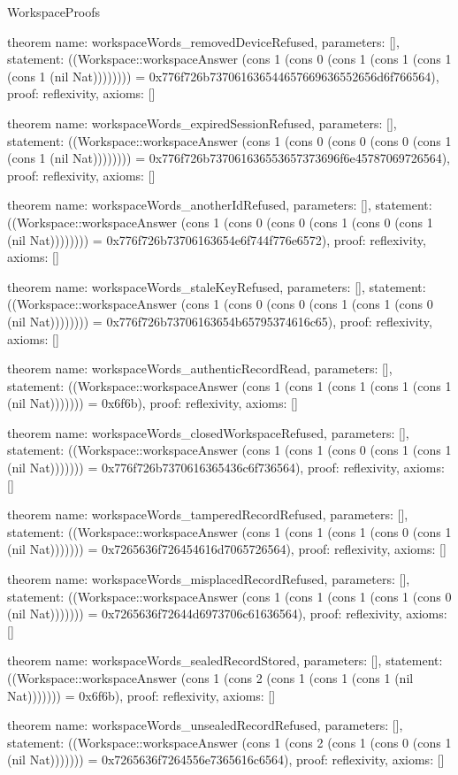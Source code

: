 \begin{lexlean}{WorkspaceProofs}
\begin{semanticmodule}
theorem{
  name: workspaceWords_removedDeviceRefused,
  parameters: [],
  statement: ((Workspace::workspaceAnswer (cons 1 (cons 0 (cons 1 (cons 1 (cons 1 (cons 1 (nil Nat)))))))) = 0x776f726b737061636544657669636552656d6f766564),
  proof: reflexivity{},
  axioms: []
}

theorem{
  name: workspaceWords_expiredSessionRefused,
  parameters: [],
  statement: ((Workspace::workspaceAnswer (cons 1 (cons 0 (cons 0 (cons 0 (cons 1 (cons 1 (nil Nat)))))))) = 0x776f726b737061636553657373696f6e45787069726564),
  proof: reflexivity{},
  axioms: []
}

theorem{
  name: workspaceWords_anotherIdRefused,
  parameters: [],
  statement: ((Workspace::workspaceAnswer (cons 1 (cons 0 (cons 0 (cons 1 (cons 0 (cons 1 (nil Nat)))))))) = 0x776f726b73706163654e6f744f776e6572),
  proof: reflexivity{},
  axioms: []
}

theorem{
  name: workspaceWords_staleKeyRefused,
  parameters: [],
  statement: ((Workspace::workspaceAnswer (cons 1 (cons 0 (cons 0 (cons 1 (cons 1 (cons 0 (nil Nat)))))))) = 0x776f726b73706163654b65795374616c65),
  proof: reflexivity{},
  axioms: []
}

theorem{
  name: workspaceWords_authenticRecordRead,
  parameters: [],
  statement: ((Workspace::workspaceAnswer (cons 1 (cons 1 (cons 1 (cons 1 (cons 1 (nil Nat))))))) = 0x6f6b),
  proof: reflexivity{},
  axioms: []
}

theorem{
  name: workspaceWords_closedWorkspaceRefused,
  parameters: [],
  statement: ((Workspace::workspaceAnswer (cons 1 (cons 1 (cons 0 (cons 1 (cons 1 (nil Nat))))))) = 0x776f726b7370616365436c6f736564),
  proof: reflexivity{},
  axioms: []
}

theorem{
  name: workspaceWords_tamperedRecordRefused,
  parameters: [],
  statement: ((Workspace::workspaceAnswer (cons 1 (cons 1 (cons 1 (cons 0 (cons 1 (nil Nat))))))) = 0x7265636f726454616d7065726564),
  proof: reflexivity{},
  axioms: []
}

theorem{
  name: workspaceWords_misplacedRecordRefused,
  parameters: [],
  statement: ((Workspace::workspaceAnswer (cons 1 (cons 1 (cons 1 (cons 1 (cons 0 (nil Nat))))))) = 0x7265636f72644d6973706c61636564),
  proof: reflexivity{},
  axioms: []
}

theorem{
  name: workspaceWords_sealedRecordStored,
  parameters: [],
  statement: ((Workspace::workspaceAnswer (cons 1 (cons 2 (cons 1 (cons 1 (cons 1 (nil Nat))))))) = 0x6f6b),
  proof: reflexivity{},
  axioms: []
}

theorem{
  name: workspaceWords_unsealedRecordRefused,
  parameters: [],
  statement: ((Workspace::workspaceAnswer (cons 1 (cons 2 (cons 1 (cons 0 (cons 1 (nil Nat))))))) = 0x7265636f7264556e7365616c6564),
  proof: reflexivity{},
  axioms: []
}


\end{semanticmodule}
\end{lexlean}
